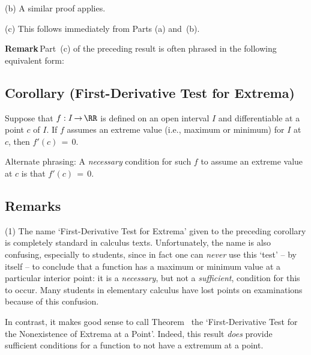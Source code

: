 \V

        (b) A similar proof applies.

\V

        (c) This follows immediately from Parts (a) and~(b). \Q


\VV

        {\bf Remark}\,Part~(c) of the preceding result is often phrased in the following equivalent form:

\V

            \subsection{\small{\bf Corollary} (First-Derivative Test for Extrema)}
            \label{CorE20.60}

        Suppose that $f:I \,{\rightarrow}\, {\RR}$ is defined on an open interval $I$ and differentiable at a point $c$ of $I$.
    If $f$ assumes an extreme value (i.e., maximum or minimum) for $I$ at $c$, then $f'(c) \,=\, 0$.

        Alternate phrasing: A {\em necessary} condition for such $f$ to assume an extreme value at $c$ is that $f'(c) \,=\, 0$.

\V

            \subsection{\small{\bf Remarks}}
            \label{RemrkE20.65}

\V

\hspace*{\parindent}(1) The name `First-Derivative Test for Extrema' given to the preceding corollary is completely standard in calculus texts.
     Unfortunately, the name is also confusing,
    especially to students, since in fact one can {\em never} use this `test' -- by itself --
    to conclude that a function has a maximum or minimum value at a particular interior point:
    it is a {\em necessary}, but not a {\em sufficient},
    condition for this to occur. Many students in elementary calculus have lost points on examinations because of this confusion.

        In contrast, it makes good sense to call Theorem~ the `First-Derivative Test for the Nonexistence of Extrema at a Point'.
     Indeed, this  result {\em does}
    provide sufficient conditions for a function to not have a extremum at a point. 

